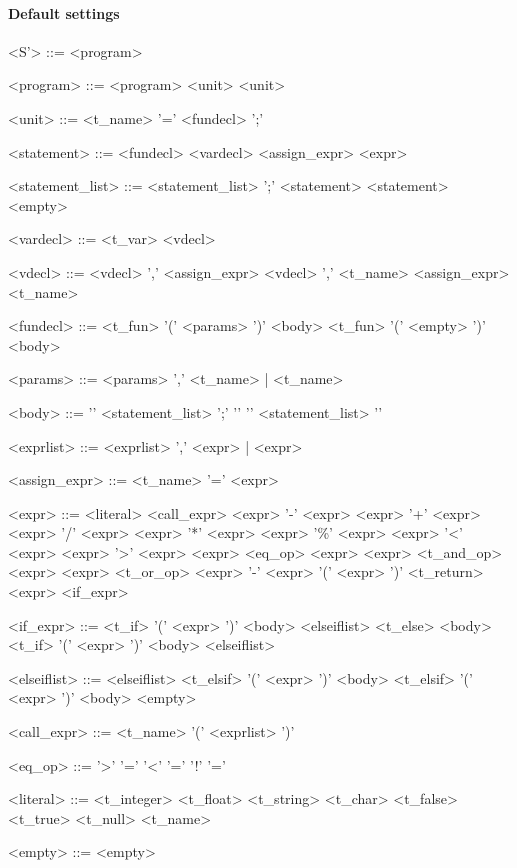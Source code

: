 \documentclass{article}
\begin{document}
\paragraph{Default settings}

\setlength{\grammarparsep}{20pt plus 1pt minus 1pt} %
\setlength{\grammarindent}{12em} %

\begin{grammar}

<S'> ::= <program>

<program> ::= <program> <unit>
\alt <unit>

<unit> ::= <t\_name> '=' <fundecl> ';'

<statement> ::= <fundecl>
\alt <vardecl>
\alt <assign\_expr>
\alt <expr>

<statement\_list> ::= <statement\_list> ';' <statement>
\alt <statement>
\alt <empty>

<vardecl> ::= <t\_var> <vdecl>

<vdecl> ::= <vdecl> ',' <assign\_expr>
\alt <vdecl> ',' <t\_name>
\alt <assign\_expr>
\alt <t\_name>

<fundecl> ::= <t\_fun> '(' <params> ')' <body>
\alt <t\_fun> '(' <empty> ')' <body>

<params> ::= <params> ',' <t\_name> | <t\_name>

<body> ::= '{' <statement\_list> ';' '}'
\alt '{' <statement\_list> '}'

<exprlist> ::= <exprlist> ',' <expr> | <expr>

<assign\_expr> ::= <t\_name> '=' <expr>

<expr> ::= <literal>
\alt <call\_expr>
\alt <expr> '-' <expr>
\alt <expr> '+' <expr>
\alt <expr> '/' <expr>
\alt <expr> '*' <expr>
\alt <expr> '\%' <expr>
\alt <expr> '\textless' <expr>
\alt <expr> '\textgreater' <expr>
\alt <expr> <eq\_op> <expr>
\alt <expr> <t\_and\_op> <expr>
\alt <expr> <t\_or\_op> <expr>
\alt '-' <expr>
\alt '(' <expr> ')'
\alt <t\_return> <expr>
\alt <if\_expr>

<if\_expr> ::= <t\_if> '(' <expr> ')' <body> <elseiflist> <t\_else> <body>
\alt <t\_if> '(' <expr> ')' <body> <elseiflist>

<elseiflist> ::= <elseiflist> <t\_elsif> '(' <expr> ')' <body>
\alt <t\_elsif> '(' <expr> ')' <body>
\alt <empty>

<call\_expr> ::= <t\_name> '(' <exprlist> ')'

<eq\_op> ::= '\textgreater' '='
\alt '\textless' '='
\alt '!' '='

<literal> ::= <t\_integer>
\alt <t\_float>
\alt <t\_string>
\alt <t\_char>
\alt <t\_false>
\alt <t\_true>
\alt <t\_null>
\alt <t\_name>

<empty> ::= <empty>

\end{grammar}
\end{document}
